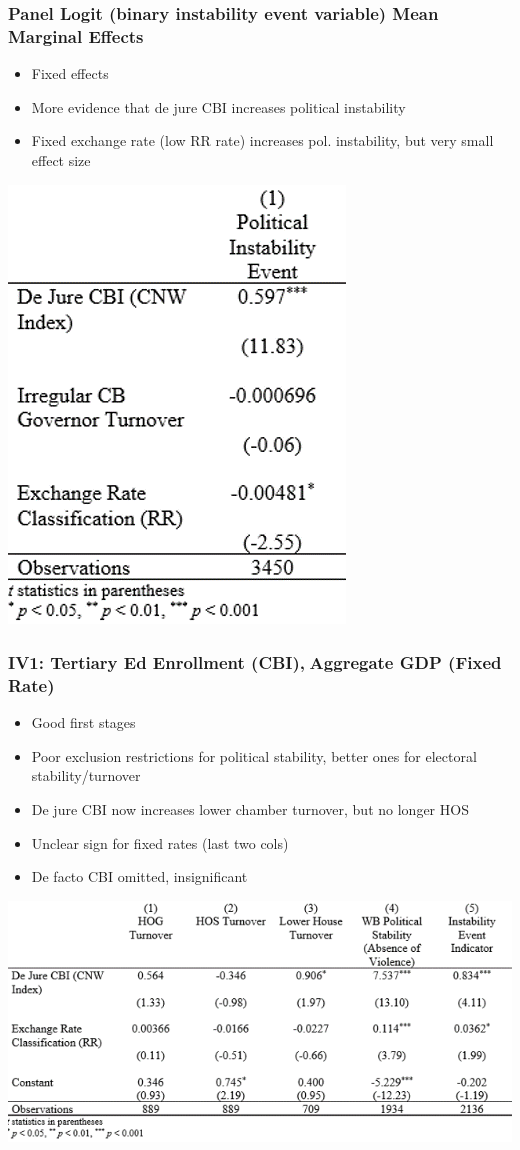 \documentclass[]{beamer}
\begin{document}
\begin{frame}
\frametitle{Panel Logit (binary instability event variable) Mean Marginal Effects}
\begin{itemize}
\item Fixed effects
\item More evidence that de jure CBI increases political instability
\item Fixed exchange rate (low RR rate) increases pol. instability, but very small effect size
\end{itemize}
\includegraphics{img0005.png}
\end{frame}


\begin{frame}
\frametitle{IV1: Tertiary Ed Enrollment (CBI),Aggregate GDP (Fixed Rate)}
\begin{itemize}
\item Good first stages
\item Poor exclusion restrictions for political stability, better ones for electoral stability/turnover
\item De jure CBI now increases lower chamber turnover, but no longer HOS
\item Unclear sign for fixed rates (last two cols)
\item De facto CBI omitted, insignificant
\end{itemize}
\includegraphics{img0006.png}
\end{frame}
\end{document}
